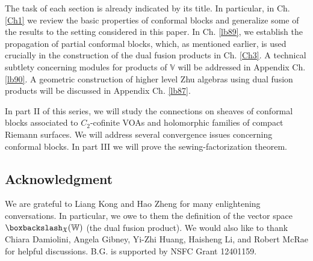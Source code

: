 \documentclass[11pt,b5paper,notitlepage]{article}
\theoremstyle{definition}
\theoremstyle{plain}
\newcommand{\Vbb}{\mathbb V}
\newcommand{\Wbb}{\mathbb W}
\newcommand{\<}{\left\langle}
\renewcommand{\>}{\right\rangle}
\newcommand{\fx}{\mathfrak{X}}
\newcommand{\bbs}{\boxbackslash}
\numberwithin{equation}{section}
\begin{document}
The task of each section is already indicated by its title. In particular, in Ch. \ref{Ch1} we review the basic properties of conformal blocks and generalize some of the results to the setting considered in this paper. In Ch. \ref{lb89}, we establish the propagation of partial conformal blocks, which, as mentioned earlier, is used crucially in the construction of the dual fusion products in Ch. \ref{Ch3}. A technical subtlety concerning modules for products of $\Vbb$ will be addressed in Appendix Ch. \ref{lb90}. A geometric construction of higher level Zhu algebras using dual fusion products will be discussed in Appendix Ch. \ref{lb87}.

In part II of this series, we will study the connections on sheaves of conformal blocks associated to $C_2$-cofinite VOAs and holomorphic families of compact Riemann surfaces. We will address several convergence issues concerning conformal blocks. In part III we will prove the sewing-factorization theorem.


\subsection*{Acknowledgment}


We are grateful to Liang Kong and Hao Zheng for many enlightening conversations. In particular, we owe to them the definition of the vector space $\bbs_\fx(\Wbb)$ (the dual fusion product). We would also like to thank 
Chiara Damiolini, Angela Gibney, Yi-Zhi Huang, Haisheng Li, and Robert McRae for helpful discussions. B.G. is supported by NSFC Grant 12401159.
\end{document}
